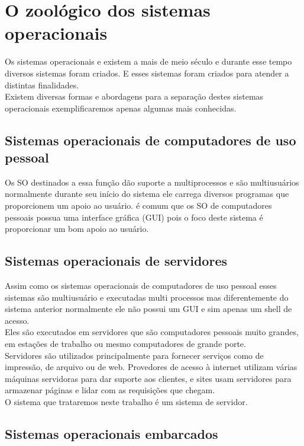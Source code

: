 \section{O zoológico dos sistemas operacionais}
Os sistemas operacionais e existem a mais de meio século e durante esse tempo diversos sistemas foram criados. E esses sistemas foram criados para atender a distintas finalidades.\\
Existem diversas formas e abordagens para a separação destes sistemas operacionais exemplificaremos apenas algumas mais conhecidas.

\subsection{Sistemas operacionais de computadores de uso pessoal}

Os SO destinados a essa função dão suporte a multiprocessos e são multiusuários normalmente durante seu início do sistema ele carrega diversos programas que proporcionem um apoio ao usuário. é comum que os SO de computadores pessoais possua uma interface gráfica (GUI) pois o foco deste sistema é proporcionar um bom apoio ao usuário.\\

\subsection{Sistemas operacionais de servidores}

Assim como os sistemas operacionais de computadores de uso pessoal esses sistemas são multiusuário e executadas multi processos mas diferentemente do sistema anterior normalmente ele não possui um GUI e sim apenas um shell de acesso.\\
Eles são executados em servidores que são computadores pessoais muito grandes, em estações de trabalho ou mesmo computadores de grande porte. \\
Servidores são utilizados principalmente para fornecer serviços como  de impressão, de arquivo ou de web. Provedores de acesso à internet utilizam várias máquinas servidoras para dar suporte aos clientes, e sites usam servidores para armazenar páginas e lidar com as requisições que chegam. \\
O sistema que trataremos neste trabalho é um sistema de servidor.\\

\subsection{Sistemas operacionais embarcados}

